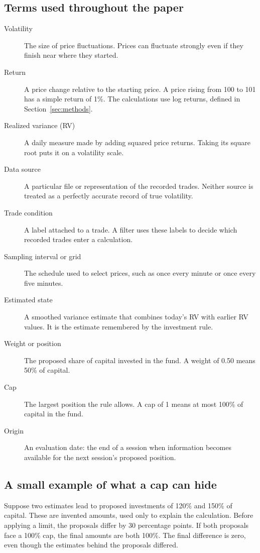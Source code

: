 \subsection*{Terms used throughout the paper}
\begin{description}
\item[Volatility] The size of price fluctuations. Prices can fluctuate strongly even if they finish near where they started.
\item[Return] A price change relative to the starting price. A price rising from 100 to 101 has a simple return of 1\%. The calculations use log returns, defined in Section~\ref{sec:methods}.
\item[Realized variance (RV)] A daily measure made by adding squared price returns. Taking its square root puts it on a volatility scale.
\item[Data source] A particular file or representation of the recorded trades. Neither source is treated as a perfectly accurate record of true volatility.
\item[Trade condition] A label attached to a trade. A filter uses these labels to decide which recorded trades enter a calculation.
\item[Sampling interval or grid] The schedule used to select prices, such as once every minute or once every five minutes.
\item[Estimated state] A smoothed variance estimate that combines today's RV with earlier RV values. It is the estimate remembered by the investment rule.
\item[Weight or position] The proposed share of capital invested in the fund. A weight of 0.50 means 50\% of capital.
\item[Cap] The largest position the rule allows. A cap of 1 means at most 100\% of capital in the fund.
\item[Origin] An evaluation date: the end of a session when information becomes available for the next session's proposed position.
\end{description}

\subsection*{A small example of what a cap can hide}
Suppose two estimates lead to proposed investments of 120\% and 150\% of capital. These are invented amounts, used only to explain the calculation. Before applying a limit, the proposals differ by 30 percentage points. If both proposals face a 100\% cap, the final amounts are both 100\%. The final difference is zero, even though the estimates behind the proposals differed.


